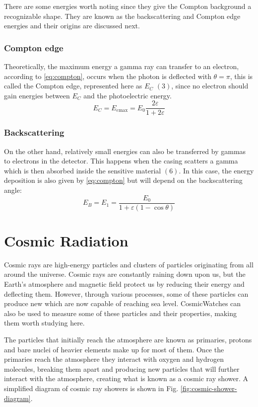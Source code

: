 There are some energies worth noting since they give the Compton background a recognizable shape. They are known as the backscattering and Compton edge energies and their origins are discussed next.

\subsubsection{Compton edge}

Theoretically, the maximum energy a gamma ray can transfer to an electron, according to \eqref{eq:compton}, occurs when the photon is deflected with $\theta=\pi$, this is called the Compton edge, represented here as $E_C$ $(3)$, since no electron should gain energies between $E_C$ and the photoelectric energy.
\begin{equation}
  E_C=E_{e\text{max}}=E_0\frac{2\varepsilon}{1+2\varepsilon}
\end{equation}

\subsubsection{Backscattering}
On the other hand, relatively small energies can also be transferred by gammas to electrons in the detector. This happens when the casing scatters a gamma which is then absorbed inside the sensitive material $(6)$. In this case, the energy deposition is also given by \eqref{eq:compton} but will depend on the backscattering angle:
\begin{equation}
    E_B=E_1=\frac{E_0}{1+\varepsilon(1-\cos\theta)}
\end{equation}

\section{Cosmic Radiation}

Cosmic rays are high-energy particles and clusters of particles originating from all around the universe. Cosmic rays are constantly raining down upon us, but the Earth's atmosphere and magnetic field protect us by reducing their energy and deflecting them. However, through various processes, some of these particles can produce new which are now capable of reaching sea level. CosmicWatches can also be used to measure some of these particles and their properties, making them worth studying here.

The particles that initially reach the atmosphere are known as primaries, protons and bare nuclei of heavier elements make up for most of them. Once the primaries reach the atmosphere they interact with oxygen and hydrogen molecules, breaking them apart and producing new particles that will further interact with the atmosphere, creating what is known as a cosmic ray shower. A simplified diagram of cosmic ray showers is shown in Fig. \ref{fig:cosmic-shower-diagram}.

